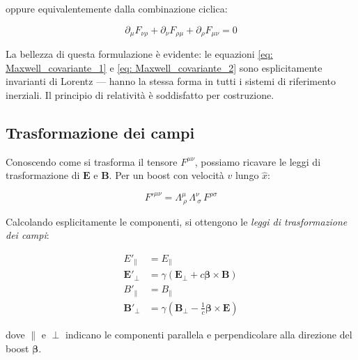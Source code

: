 oppure equivalentemente dalla combinazione ciclica:

\begin{equation}
    \partial_\mu F_{\nu\rho} + \partial_\nu F_{\rho\mu} + 
    \partial_\rho F_{\mu\nu} = 0
\end{equation}

La bellezza di questa formulazione è evidente: le equazioni \eqref{eq: Maxwell_covariante_1} e \eqref{eq: Maxwell_covariante_2} sono esplicitamente invarianti di Lorentz — hanno la stessa forma in tutti i sistemi di riferimento inerziali. 
Il principio di relatività è soddisfatto per costruzione.

\subsection{Trasformazione dei campi}

Conoscendo come si trasforma il tensore $F^{\mu\nu}$, possiamo ricavare le leggi di trasformazione di $\mathbf{E}$ e $\mathbf{B}$. Per un boost con velocità $v$ lungo $\hat{x}$:

\begin{equation}
    F'^{\mu\nu} = \Lambda^\mu_{\ \rho}\,\Lambda^\nu_{\ \sigma}\,
    F^{\rho\sigma}
\end{equation}

\newpage

Calcolando esplicitamente le componenti, si ottengono le \emph{leggi di trasformazione dei campi}: 

\begin{tcolorbox}[colback=yellow!10!white, colframe=orange!70!black, boxrule=0.8pt]
\begin{align}
    E'_\parallel &= E_\parallel \label{eq: trasf_E_par} \\
    \mathbf{E}'_\perp &= \gamma\left(\mathbf{E}_\perp + c\boldsymbol{\beta}\times\mathbf{B}\right) \label{eq: trasf_E_perp} \\[6pt]
    B'_\parallel &= B_\parallel \label{eq: trasf_B_par} \\
    \mathbf{B}'_\perp &= \gamma\left(\mathbf{B}_\perp - \frac{1}{c}\boldsymbol{\beta}\times\mathbf{E}\right) \label{eq: trasf_B_perp}
\end{align}
\end{tcolorbox}

dove $\parallel$ e $\perp$ indicano le componenti parallela e perpendicolare alla direzione del boost $\boldsymbol{\beta}$.\\

